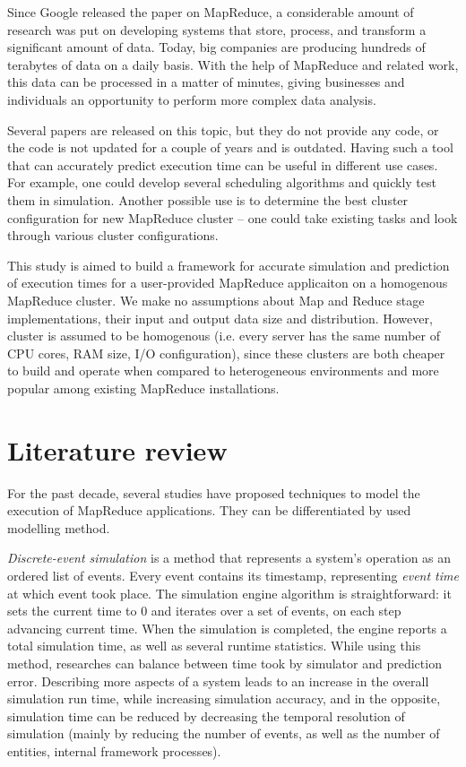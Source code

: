 \documentclass[conference]{IEEEtran} \IEEEoverridecommandlockouts
\begin{document}
    Since Google released the paper \cite{google_mapreduce} on MapReduce, a
    considerable amount of research was put on developing systems that store,
    process, and transform a significant amount of data. Today, big companies
    are producing hundreds of terabytes of data on a daily basis. With the help
    of MapReduce and related work, this data can be processed in a matter of
    minutes, giving businesses and individuals an opportunity to perform more
    complex data analysis. 

    Several papers are released on this topic, but they do not provide any
    code, or the code is not updated for a couple of years and is outdated.
    Having such a tool that can accurately predict execution time can be useful
    in different use cases. For example, one could develop several scheduling
    algorithms and quickly test them in simulation. Another possible use is to
    determine the best cluster configuration for new MapReduce cluster -- one
    could take existing tasks and look through various cluster configurations.

    This study is aimed to build a framework for accurate simulation and
    prediction of execution times for a user-provided MapReduce applicaiton on
    a homogenous MapReduce cluster. We make no assumptions about Map and Reduce
    stage implementations, their input and output data size and distribution.
    However, cluster is assumed to be homogenous (i.e. every server has the
    same number of CPU cores, RAM size, I/O configuration), since these
    clusters are both cheaper to build and operate when compared to
    heterogeneous environments and more popular among existing MapReduce
    installations.

    \section{Literature review} 
    \label{literature_review} 

    For the past decade, several studies have proposed techniques to model the
    execution of MapReduce applications. They can be differentiated by used
    modelling method. 

    \textit{Discrete-event simulation} is a method that represents a system's
    operation as an ordered list of events. Every event contains its timestamp,
    representing \textit{event time} at which event took place. The simulation
    engine algorithm is straightforward: it sets the current time to 0 and
    iterates over a set of events, on each step advancing current time. When
    the simulation is completed, the engine reports a total simulation time, as
    well as several runtime statistics. While using this method, researches can
    balance between time took by simulator and prediction error. Describing
    more aspects of a system leads to an increase in the overall simulation run
    time, while increasing simulation accuracy, and in the opposite, simulation
    time can be reduced by decreasing the temporal resolution of simulation
    (mainly by reducing the number of events, as well as the number of
    entities, internal framework processes).
\end{document}
